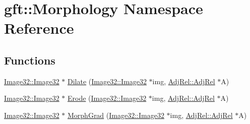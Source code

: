 \hypertarget{namespacegft_1_1Morphology}{\section{gft\-:\-:Morphology Namespace Reference}
\label{namespacegft_1_1Morphology}
}
\subsection*{Functions}
\begin{DoxyCompactItemize}
\item 
\hyperlink{namespacegft_1_1Image32_a6c5a03566b593bb406f1fe33266a0382}{Image32\-::\-Image32} $\ast$ \hyperlink{namespacegft_1_1Morphology_a85f929d063896d68100b3bdf11a44014}{Dilate} (\hyperlink{namespacegft_1_1Image32_a6c5a03566b593bb406f1fe33266a0382}{Image32\-::\-Image32} $\ast$img, \hyperlink{namespacegft_1_1AdjRel_a832ff5521af7a9801ff18dc3ae629b68}{Adj\-Rel\-::\-Adj\-Rel} $\ast$A)
\item 
\hyperlink{namespacegft_1_1Image32_a6c5a03566b593bb406f1fe33266a0382}{Image32\-::\-Image32} $\ast$ \hyperlink{namespacegft_1_1Morphology_a9a9eac5667e6557c0164b6e97ee2548a}{Erode} (\hyperlink{namespacegft_1_1Image32_a6c5a03566b593bb406f1fe33266a0382}{Image32\-::\-Image32} $\ast$img, \hyperlink{namespacegft_1_1AdjRel_a832ff5521af7a9801ff18dc3ae629b68}{Adj\-Rel\-::\-Adj\-Rel} $\ast$A)
\item 
\hyperlink{namespacegft_1_1Image32_a6c5a03566b593bb406f1fe33266a0382}{Image32\-::\-Image32} $\ast$ \hyperlink{namespacegft_1_1Morphology_aef548a6b29c14eac1f48e9a40e491eaf}{Morph\-Grad} (\hyperlink{namespacegft_1_1Image32_a6c5a03566b593bb406f1fe33266a0382}{Image32\-::\-Image32} $\ast$img, \hyperlink{namespacegft_1_1AdjRel_a832ff5521af7a9801ff18dc3ae629b68}{Adj\-Rel\-::\-Adj\-Rel} $\ast$A)
\end{DoxyCompactItemize}


